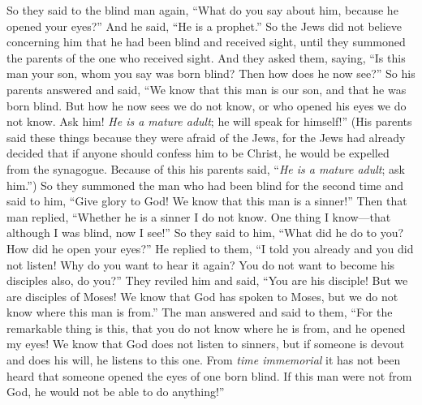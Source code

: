 \begin{biblechapter}
\verse So they said to the blind man again, “What do you say about him, because he opened your eyes?” And he said, “He is a prophet.”
\verse So the Jews did not believe concerning him that he had been blind and received sight, until they summoned the parents of the one who received sight.
\verse And they asked them, saying, “Is this man your son, whom you say was born blind? Then how does he now see?”
\verse So his parents answered and said, “We know that this man is our son, and that he was born blind.
\verse But how he now sees we do not know, or who opened his eyes we do not know. Ask him! \textit{He is a mature adult}; he will speak for himself!”
\verse (His parents said these things because they were afraid of the Jews, for the Jews had already decided that if anyone should confess him to be Christ, he would be expelled from the synagogue.
\verse Because of this his parents said, “\textit{He is a mature adult}; ask him.”)
\verse So they summoned the man who had been blind for the second time and said to him, “Give glory to God! We know that this man is a sinner!”
\verse Then that man replied, “Whether he is a sinner I do not know. One thing I know—that although I was blind, now I see!”
\verse So they said to him, “What did he do to you? How did he open your eyes?”
\verse He replied to them, “I told you already and you did not listen! Why do you want to hear it again? You do not want to become his disciples also, do you?”
\verse They reviled him and said, “You are his disciple! But we are disciples of Moses!
\verse We know that God has spoken to Moses, but we do not know where this man is from.”
\verse The man answered and said to them, “For the remarkable thing is this, that you do not know where he is from, and he opened my eyes!
\verse We know that God does not listen to sinners, but if someone is devout and does his will, he listens to this one.
\verse From \textit{time immemorial} it has not been heard that someone opened the eyes of one born blind.
\verse If this man were not from God, he would not be able to do anything!”

\end{biblechapter}
